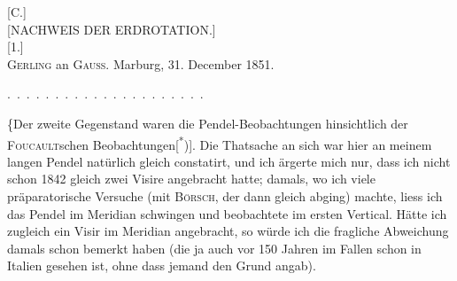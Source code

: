 \clearpage\begingroup{}\NoSourceHead
\begin{center}
[C.]\\[.8em]
[NACHWEIS DER ERDROTATION.]\\[1.2em]
[1.]\\[.7em]
\textsc{Gerling} an \textsc{Gauss}. Marburg, 31. December 1851.
\end{center}
\noindent .\ .\ .\ .\ .\ .\ .\ .\ .\ .\ .\ .\ .\ .\ .\ .\ .\ .\ .\ .\ .
\par\noindent\hspace*{\parindent}\{Der zweite Gegenstand waren die Pendel-Beobachtungen hinsichtlich der
\textsc{Foucault}schen Beobachtungen[\textsuperscript{*})]\begingroup\renewcommand{\thefootnote}{}\endgroup. Die Thatsache an sich war hier an meinem
langen Pendel natürlich gleich constatirt, und ich ärgerte mich nur, dass ich
nicht schon 1842 gleich zwei Visire angebracht hatte; damals, wo ich viele
präparatorische Versuche (mit \textsc{Börsch}, der dann gleich abging) machte, liess
ich das Pendel im Meridian schwingen und beobachtete im ersten Vertical.
Hätte ich zugleich ein Visir im Meridian angebracht, so würde ich die fragliche
Abweichung damals schon bemerkt haben (die ja auch vor 150 Jahren
im Fallen schon in Italien gesehen ist, ohne dass jemand den Grund angab).

